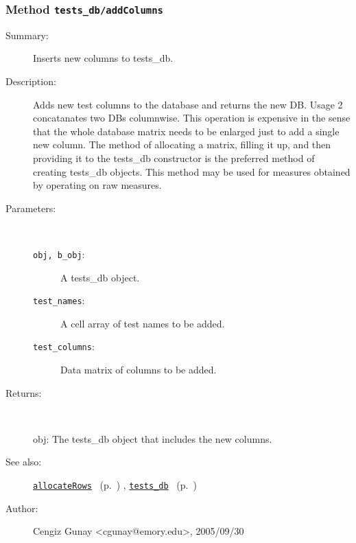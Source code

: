 \subsubsection[Method \texttt{addColumns}]{Method \texttt{tests\_db/addColumns}}%
%
\label{ref_tests_db__addColumns}%
\hypertarget{ref_tests_db__addColumns}{}%
\begin{description}
\item[Summary:]Inserts new columns to tests\_db.
%
%
\item[Description:]%
Adds new test columns to the database and returns the new DB.
 Usage 2 concatanates two DBs columnwise. This operation is 
 expensive in the sense that the whole database matrix needs to be 
 enlarged just to add a single new column. The method of allocating
 a matrix, filling it up, and then providing it to the tests\_db 
 constructor is the preferred method of creating tests\_db objects. 
 This method may be used for measures obtained by operating on raw measures.
\item[Parameters:]~
\begin{description}%
\item[\texttt{obj, b\_obj}:]
 A tests\_db object.
\item[\texttt{test\_names}:]
 A cell array of test names to be added.
\item[\texttt{test\_columns}:]
 Data matrix of columns to be added.
\end{description}%
%
\item[Returns:]~

	obj: The tests\_db object that includes the new columns.
%
%
\item[See also:]%
\hyperlink{ref_allocateRows}{\texttt{allocateRows}}%
\ (p.~\pageref{ref_allocateRows})%
%
, \hyperlink{ref_tests_db}{\texttt{tests\_db}}%
\ (p.~\pageref{ref_tests_db})%
%
%
\item[Author:]%
Cengiz Gunay <cgunay@emory.edu>, 2005/09/30%
\end{description}
\methodline%
